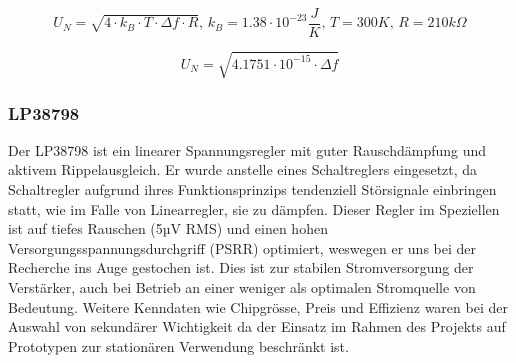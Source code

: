 \begin{equation}
    U_N = \sqrt{4 \cdot k_B \cdot T \cdot \Delta f \cdot R},\,k_B = 1.38\cdot 10^{-23}\frac{J}{K},\,T = 300K,\,R = 210k\Omega
\label{eq:DAC_rauschen}
\end{equation}

\begin{equation}
    U_N = \sqrt{4.1751\cdot 10^{-15} \cdot \Delta f}
\label{eq:DAC_rauschen2}
\end{equation}

\subsubsection{LP38798}
Der LP38798 ist ein linearer Spannungsregler mit guter Rauschdämpfung und aktivem Rippelausgleich. Er wurde anstelle eines Schaltreglers eingesetzt, da Schaltregler aufgrund ihres Funktionsprinzips tendenziell Störsignale einbringen statt, wie im Falle von Linearregler, sie zu dämpfen.
Dieser Regler im Speziellen ist auf tiefes Rauschen (5µV RMS) und einen hohen Versorgungsspannungsdurchgriff (PSRR) optimiert, weswegen er uns bei der Recherche ins Auge gestochen ist. Dies ist zur stabilen Stromversorgung der Verstärker, auch bei Betrieb an einer weniger als optimalen Stromquelle von Bedeutung.
Weitere Kenndaten wie Chipgrösse, Preis und Effizienz waren bei der Auswahl von sekundärer Wichtigkeit da der Einsatz im Rahmen des Projekts auf Prototypen zur stationären Verwendung beschränkt ist.

